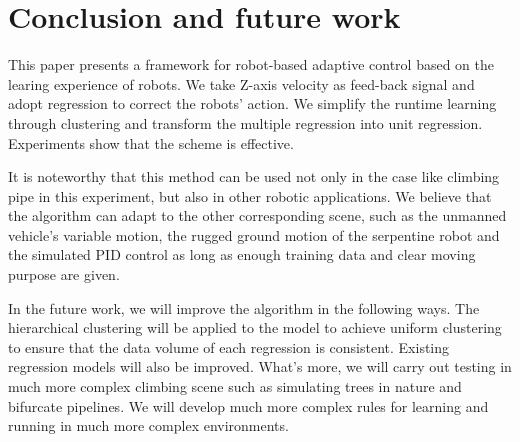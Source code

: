 \section{Conclusion and future work}
This paper presents a framework for robot-based adaptive control based on the learing experience of robots. We take Z-axis velocity as feed-back signal and adopt regression to correct the robots' action. We simplify the runtime learning through clustering and transform the multiple regression into unit regression. Experiments show that the scheme is effective.

It is noteworthy that this method can be used not only in the case like climbing pipe in this experiment, but also in other robotic applications. We believe that the algorithm can adapt to the other corresponding scene, such as the unmanned vehicle's variable motion, the rugged ground motion of the serpentine robot and the simulated PID control as long as enough training data and clear moving purpose are given.

In the future work, we will improve the algorithm in the following ways. The hierarchical clustering\cite{HierarchicalKmeans}\cite{HierarchicalClusterBased} will be applied to the model to achieve uniform clustering to ensure that the data volume of each regression is consistent. Existing regression models will also be improved. What's more, we will carry out testing in much more complex climbing scene such as simulating trees in nature and bifurcate pipelines. We will develop much more complex rules for learning and running in much more complex environments.